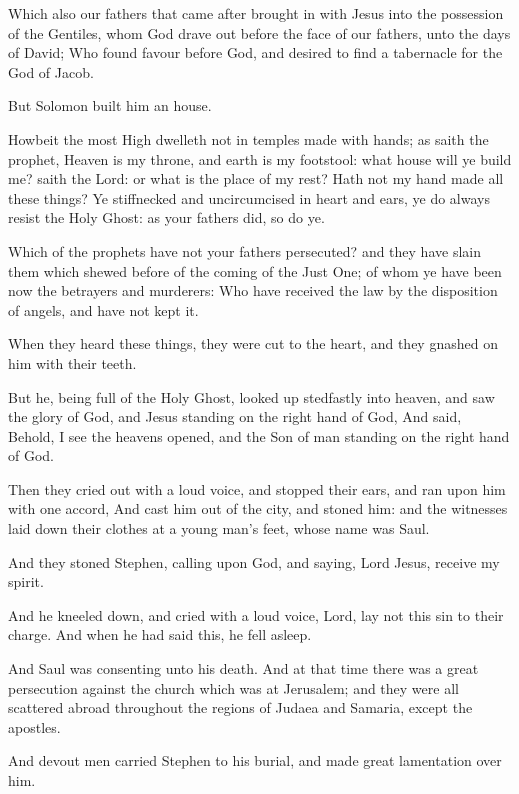 \Verse Which also our fathers that came after brought in with Jesus into the possession of the Gentiles, whom God drave out before the face of our fathers, unto the days of David; \Verse Who found favour before God, and desired to find a tabernacle for the God of Jacob.

\Verse But Solomon built him an house.

\Verse Howbeit the most High dwelleth not in temples made with hands; as saith the prophet, \Verse Heaven is my throne, and earth is my footstool: what house will ye build me? saith the Lord: or what is the place of my rest?  \Verse Hath not my hand made all these things?  \Verse Ye stiffnecked and uncircumcised in heart and ears, ye do always resist the Holy Ghost: as your fathers did, so do ye.

\Verse Which of the prophets have not your fathers persecuted? and they have slain them which shewed before of the coming of the Just One; of whom ye have been now the betrayers and murderers: \Verse Who have received the law by the disposition of angels, and have not kept it.

\Verse When they heard these things, they were cut to the heart, and they gnashed on him with their teeth.

\Verse But he, being full of the Holy Ghost, looked up stedfastly into heaven, and saw the glory of God, and Jesus standing on the right hand of God, \Verse And said, Behold, I see the heavens opened, and the Son of man standing on the right hand of God.

\Verse Then they cried out with a loud voice, and stopped their ears, and ran upon him with one accord, \Verse And cast him out of the city, and stoned him: and the witnesses laid down their clothes at a young man's feet, whose name was Saul.

\Verse And they stoned Stephen, calling upon God, and saying, Lord Jesus, receive my spirit.

\Verse And he kneeled down, and cried with a loud voice, Lord, lay not this sin to their charge. And when he had said this, he fell asleep.


\Chapter
\Verse And Saul was consenting unto his death. And at that time there was a great persecution against the church which was at Jerusalem; and they were all scattered abroad throughout the regions of Judaea and Samaria, except the apostles.

\Verse And devout men carried Stephen to his burial, and made great lamentation over him.

